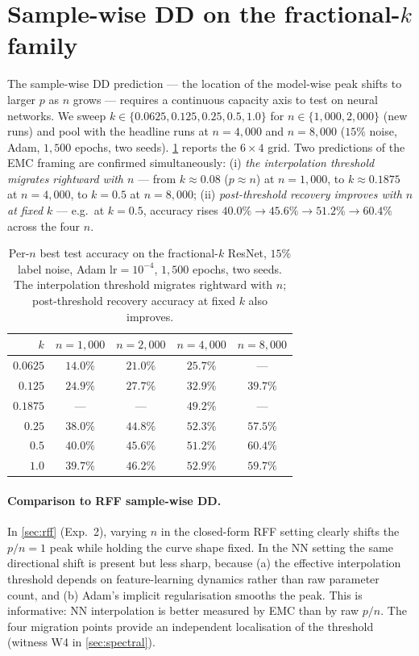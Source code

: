 \section{Sample-wise DD on the fractional-$k$ family}
\label{sec:samplewise}

The sample-wise DD prediction --- the location of the model-wise peak shifts to larger $p$ as $n$ grows --- requires a continuous capacity axis to test on neural networks. We sweep $k\in\{0.0625, 0.125, 0.25, 0.5, 1.0\}$ for $n\in\{1{,}000, 2{,}000\}$ (new runs) and pool with the headline runs at $n=4{,}000$ and $n=8{,}000$ ($15\%$ noise, Adam, $1{,}500$ epochs, two seeds). \cref{tab:samplewise} reports the $6\times 4$ grid. Two predictions of the EMC framing are confirmed simultaneously: (i) \emph{the interpolation threshold migrates rightward with $n$} --- from $k\!\approx\!0.08$ ($p\!\approx\!n$) at $n\!=\!1{,}000$, to $k\!\approx\!0.1875$ at $n\!=\!4{,}000$, to $k\!=\!0.5$ at $n\!=\!8{,}000$; (ii) \emph{post-threshold recovery improves with $n$ at fixed $k$} --- e.g.\ at $k\!=\!0.5$, accuracy rises $40.0\%\!\to\!45.6\%\!\to\!51.2\%\!\to\!60.4\%$ across the four $n$.

\begin{table}[t]
  \centering
  \small
  \caption{Per-$n$ best test accuracy on the fractional-$k$ ResNet, $15\%$ label noise, Adam $\mathrm{lr}\!=\!10^{-4}$, $1{,}500$ epochs, two seeds. The interpolation threshold migrates rightward with $n$; post-threshold recovery accuracy at fixed $k$ also improves.}
  \label{tab:samplewise}
  \begin{tabular}{@{}rcccc@{}}
    \toprule
    $k$ & $n=1{,}000$ & $n=2{,}000$ & $n=4{,}000$ & $n=8{,}000$ \\
    \midrule
    $0.0625$ & $14.0\%$ & $21.0\%$ & $25.7\%$ & --- \\
    $0.125$  & $24.9\%$ & $27.7\%$ & $32.9\%$ & $39.7\%$ \\
    $0.1875$ & ---      & ---      & $\mathbf{49.2\%}$ & --- \\
    $0.25$   & $38.0\%$ & $44.8\%$ & $52.3\%$ & $\mathbf{57.5\%}$ \\
    $0.5$    & $40.0\%$ & $45.6\%$ & $51.2\%$ & $\mathbf{60.4\%}$ \\
    $1.0$    & $39.7\%$ & $46.2\%$ & $52.9\%$ & $59.7\%$ \\
    \bottomrule
  \end{tabular}
\end{table}

\paragraph{Comparison to RFF sample-wise DD.} In \cref{sec:rff} (Exp.\ 2), varying $n$ in the closed-form RFF setting clearly shifts the $p/n=1$ peak while holding the curve shape fixed. In the NN setting the same directional shift is present but less sharp, because (a) the effective interpolation threshold depends on feature-learning dynamics rather than raw parameter count, and (b) Adam's implicit regularisation smooths the peak. This is informative: NN interpolation is better measured by EMC than by raw $p/n$. The four migration points provide an independent localisation of the threshold (witness W4 in \cref{sec:spectral}).

